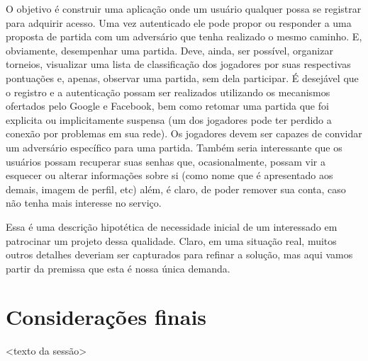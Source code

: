       O objetivo é construir uma aplicação onde um usuário qualquer possa se
      registrar para adquirir acesso. Uma vez autenticado ele pode propor ou
      responder a uma proposta de partida com um adversário que tenha realizado
      o mesmo caminho. E, obviamente, desempenhar uma partida. Deve, ainda, ser
      possível, organizar torneios, visualizar uma lista de classificação dos
      jogadores por suas respectivas pontuações e, apenas, observar uma partida,
      sem dela participar. É desejável que o registro e a autenticação possam
      ser realizados utilizando os mecanismos ofertados pelo Google e Facebook,
      bem como retomar uma partida que foi explicita ou implicitamente suspensa
      (um dos jogadores pode ter perdido a conexão por problemas em sua rede).
      Os jogadores devem ser capazes de convidar um adversário específico para
      uma partida. Também seria interessante que os usuários possam recuperar
      suas senhas que, ocasionalmente, possam vir a esquecer ou alterar
      informações sobre si (como nome que é apresentado aos demais, imagem de
      perfil, etc) além, é claro, de poder remover sua conta, caso não tenha
      mais interesse no serviço.

      Essa é uma descrição hipotética de necessidade inicial de um interessado
      em patrocinar um projeto dessa qualidade. Claro, em uma situação real,
      muitos outros detalhes deveriam ser capturados para refinar a solução, mas
      aqui vamos partir da premissa que esta é nossa única demanda.


    


  \section{Considerações finais}

    <texto da sessão>


  \clearpage

  \renewcommand\refname{Referências}

    
    


